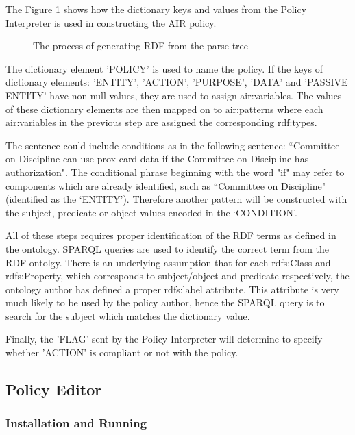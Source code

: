 \documentclass{llncs}
\begin{document}
The Figure \ref{fig-rdf-gen} shows how the dictionary keys and values from the Policy Interpreter is used in constructing the AIR policy.

\begin{figure}[!h]
  \centerline{}
  \caption{The process of generating RDF from the parse tree}
  \label{fig-rdf-gen}
\end{figure}

The dictionary element 'POLICY' is used to name the policy. If the keys of dictionary elements: 'ENTITY', 'ACTION', 'PURPOSE', 'DATA' and 'PASSIVE ENTITY' have non-null values, they are used to assign air:variables. The values of these dictionary elements are then mapped on to air:patterns where each air:variables in the previous step are assigned the corresponding rdf:types.

The sentence could include conditions as in the following sentence: ``Committee on Discipline can use prox card data if the Committee on Discipline has authorization". The conditional phrase beginning with the word "if" may refer to components which are already identified, such as ``Committee on Discipline" (identified as the `ENTITY'). Therefore another pattern will be constructed with the subject, predicate or object values encoded in the `CONDITION'.

All of these steps requires proper identification of the RDF terms as defined in the ontology. SPARQL queries are used to identify the correct term from the RDF ontolgy. There is an underlying assumption that for each rdfs:Class and rdfs:Property, which corresponds to subject/object and predicate respectively, the ontology author has defined a proper rdfs:label attribute. This attribute is very much likely to be used by the policy author, hence the SPARQL query is to search for the subject which matches the dictionary value.

Finally, the 'FLAG' sent by the Policy Interpreter will determine to specify whether 'ACTION' is compliant or not with the policy.


\subsection{Policy Editor}

\subsubsection{Installation and Running}
\end{document}
